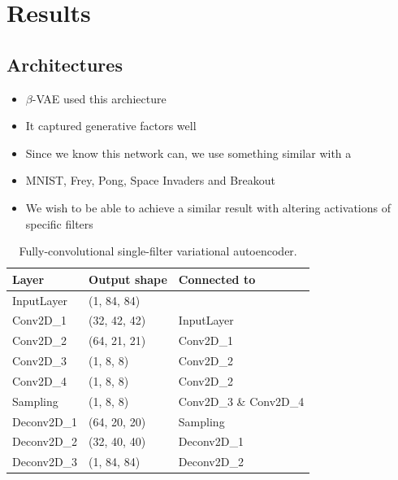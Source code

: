 \chapter{Results}

\label{ch:Results}


%
%
%
%
%
\section{Architectures}

\begin{itemize}
\item $\beta$-VAE used this archiecture 
\item It captured generative factors well
\item Since we know this network can, we use something similar with a 
\item MNIST, Frey, Pong, Space Invaders and Breakout
\item We wish to be able to achieve a similar result with altering activations of specific filters
\end{itemize}


\begin{table}[]
\centering
\label{my-label}
\begin{tabular}{@{}lll@{}}
\toprule
\textbf{Layer} & \textbf{Output shape} & \textbf{Connected to}  \\ \midrule
InputLayer     & (1, 84, 84)           &                        \\
Conv2D\_1      & (32, 42, 42)          & InputLayer             \\
Conv2D\_2      & (64, 21, 21)          & Conv2D\_1              \\
Conv2D\_3      & (1, 8, 8)             & Conv2D\_2              \\
Conv2D\_4      & (1, 8, 8)             & Conv2D\_2              \\
Sampling       & (1, 8, 8)             & Conv2D\_3 \& Conv2D\_4 \\
Deconv2D\_1    & (64, 20, 20)          & Sampling               \\
Deconv2D\_2    & (32, 40, 40)          & Deconv2D\_1            \\
Deconv2D\_3    & (1, 84, 84)           & Deconv2D\_2           
\end{tabular}
\caption{Fully-convolutional single-filter variational autoencoder.}
\end{table}


